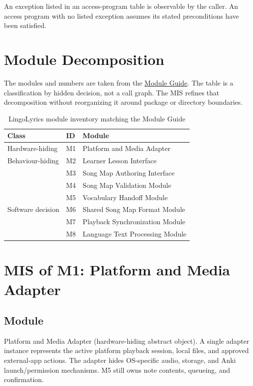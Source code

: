 \documentclass[12pt, titlepage]{article}
\begin{document}
An exception listed in an access-program table is observable by the caller.
An access program with no listed exception assumes its stated preconditions
have been satisfied.

\section{Module Decomposition} \label{SecMISModules}

The modules and numbers are taken from the
\href{https://github.com/rhea333/LingoLyrics/blob/main/docs/Design/SoftArchitecture/MG.tex}
{Module Guide}. The table is a classification by hidden decision,
not a call graph. The MIS refines that decomposition without reorganizing it
around package or directory boundaries.

\begin{table}[H]
\centering
\begin{tabularx}{\textwidth}{@{}p{}lX@{}}
\toprule
\textbf{Class} & \textbf{ID} & \textbf{Module}\\
\midrule
Hardware-hiding & M1 & Platform and Media Adapter\\
Behaviour-hiding & M2 & Learner Lesson Interface\\
 & M3 & Song Map Authoring Interface\\
 & M4 & Song Map Validation Module\\
 & M5 & Vocabulary Handoff Module\\
Software decision & M6 & Shared Song Map Format Module\\
 & M7 & Playback Synchronization Module\\
 & M8 & Language Text Processing Module\\
\bottomrule
\end{tabularx}
\caption{LingoLyrics module inventory matching the Module Guide}
\label{TblMH}
\end{table}

\clearpage
\section{MIS of M1: Platform and Media Adapter} \label{MISM1}

\subsection{Module}
Platform and Media Adapter (hardware-hiding abstract object).
A single adapter instance represents the active platform playback
session, local files, and approved external-app actions. The
adapter hides OS-specific audio, storage, and Anki launch/permission
mechanisms. M5 still owns note contents, queueing, and confirmation.
\end{document}
